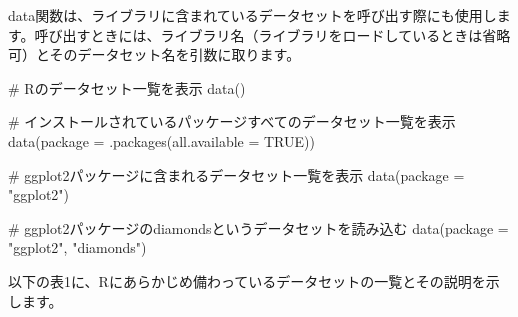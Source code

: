 \documentclass[
  letterpaper,
  DIV=11,
  numbers=noendperiod]{scrreprt}
\newenvironment{Shaded}{\begin{snugshade}}{\end{snugshade}}
\newcommand{\AttributeTok}[1]{\textcolor[rgb]{0.40,0.45,0.13}{#1}}
\newcommand{\CommentTok}[1]{\textcolor[rgb]{0.37,0.37,0.37}{#1}}
\newcommand{\ConstantTok}[1]{\textcolor[rgb]{0.56,0.35,0.01}{#1}}
\newcommand{\FunctionTok}[1]{\textcolor[rgb]{0.28,0.35,0.67}{#1}}
\newcommand{\NormalTok}[1]{\textcolor[rgb]{0.00,0.23,0.31}{#1}}
\newcommand{\StringTok}[1]{\textcolor[rgb]{0.13,0.47,0.30}{#1}}
\begin{document}
data関数は、ライブラリに含まれているデータセットを呼び出す際にも使用します。呼び出すときには、ライブラリ名（ライブラリをロードしているときは省略可）とそのデータセット名を引数に取ります。

\begin{Shaded}
\begin{Highlighting}[]
\CommentTok{\# Rのデータセット一覧を表示}
\FunctionTok{data}\NormalTok{()}

\CommentTok{\# インストールされているパッケージすべてのデータセット一覧を表示}
\FunctionTok{data}\NormalTok{(}\AttributeTok{package =} \FunctionTok{.packages}\NormalTok{(}\AttributeTok{all.available =} \ConstantTok{TRUE}\NormalTok{))}

\CommentTok{\# ggplot2パッケージに含まれるデータセット一覧を表示}
\FunctionTok{data}\NormalTok{(}\AttributeTok{package =} \StringTok{"ggplot2"}\NormalTok{)}

\CommentTok{\# ggplot2パッケージのdiamondsというデータセットを読み込む}
\FunctionTok{data}\NormalTok{(}\AttributeTok{package =} \StringTok{"ggplot2"}\NormalTok{, }\StringTok{"diamonds"}\NormalTok{)}
\end{Highlighting}
\end{Shaded}

以下の表1に、Rにあらかじめ備わっているデータセットの一覧とその説明を示します。
\end{document}
